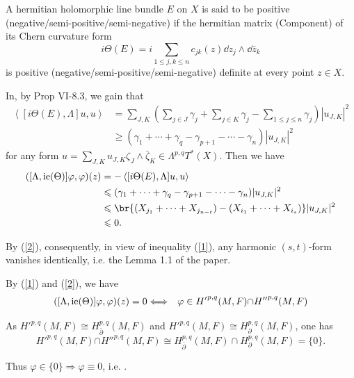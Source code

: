 \documentclass[lang=en,12pt]{beautybook}
\begin{document}
\begin{definition}
  A hermitian holomorphic line bundle $E$ on $X$ is said to be positive (negative/semi-positive/semi-negative) if the hermitian matrix (Component) of its Chern curvature form
  \[i\Theta(E)=i\sum_{1\leqslant j,k\leqslant n}c_{jk}(z)\dd z_j\wedge\dd \bar{z}_k\]
  is positive (negative/semi-positive/semi-negative) definite at every point $z\in X$.
\end{definition}
In\cite[P334]{CACA},  by Prop VI-8.3, we gain that
\begin{align*}
  \left\langle [i\Theta(E),\Lambda]u,u\right\rangle & = \sum_{J,K} (\sum_{j\in J}\gamma_j+\sum_{j\in K}\gamma_j-\sum_{1\leqslant j\leqslant n}\gamma_j)|u_{J,K}|^2 \\
                                                    & \geqslant (\gamma_1+\cdots+\gamma_q-\gamma_{p+1}-\cdots-\gamma_n)|u_{J,K}|^2
\end{align*}
for any form $u=\sum_{J,K} u_{J,K} \zeta_J\wedge\bar{\zeta}_K\in \Lambda^{p,q}T^*(X)$.
Then we have
\begin{align*}
  ( [\Lambda, \tmop{ie} (\Theta)] \varphi, \varphi) (z) & =-\left\langle [i\Theta(E),\Lambda]u,u\right\rangle                              \\
                                                        & \leqslant  (\gamma_1+\cdots+\gamma_q-\gamma_{p+1}-\cdots-\gamma_n)|u_{J,K}|^2    \\
                                                        & \leqslant \br{(X_{j_1}+\cdots+X_{j_{n-t}}) -(X_{i_1}+\cdots+X_{i_s})}|u_{J,K}|^2 \\
                                                        & \leqslant 0.
\end{align*}

By (\ref{2}), consequently, in view of inequality (\ref{1}), any harmonic $(s,
  t)$-form vanishes identically, i.e. the Lemma 1.1 of the paper.

\begin{remark}
  By (\ref{1}) and (\ref{2}), we have \cite[Lemma2,P483]{calabi1960compact}
  \begin{eqnarray*}
    ( [\Lambda, \operatorname{ie} (\Theta)] \varphi, \varphi) (z) = 0 &
    \Longleftrightarrow & {\varphi \in H'}^{p, q} (M, F) {\cap H''}^{p, q} (M,
    F)
  \end{eqnarray*}

  As ${H'}^{p, q} (M, F) \cong H_{\bar{\partial}}^{p, q} (M, F)$ and ${H'}^{p,
        q} (M, F) \cong H_{\partial}^{p, q} (M, F)$, one has
  \begin{equation}
    {H'}^{p, q} (M, F) {\cap H''}^{p, q} (M, F) \cong H_{\bar{\partial}}^{p, q}
    (M, F) \cap H_{\partial}^{p, q} (M, F) = \{ 0 \} . \label{3}
  \end{equation}

  Thus $\varphi \in \{ 0 \} \Longrightarrow \varphi \equiv 0$, i.e.
    {}.
\end{remark}
\end{document}
